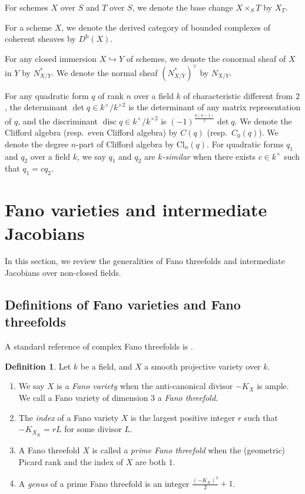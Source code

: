 \documentclass[autodetect-engine, a4paper]{amsart}
\theoremstyle{definition}
\newtheorem{defn}[thm]{Definition}
\DeclareMathOperator\disc{\mathrm{disc}}
\begin{document}
For schemes $X$ over $S$ and $T$ over $S$, we denote the base change $X \times_{S} T$ by $X_{T}$.

For a scheme $X$, we denote the derived category of bounded complexes of coherent sheaves by $D^{\mathrm{b}} (X)$.

For any closed immersion $X \hookrightarrow Y$ of schemes, we denote the conormal sheaf of $X$ in $Y$ by $N^{\ast}_{X/Y}$.
We denote the normal sheaf $(N^{\ast}_{X/Y})^{\vee}$ by $N_{X/Y}$.

For any quadratic form $q$ of rank $n$ over a field $k$ of characteristic different from $2$, the determinant $\det q \in k^{\times}/ k^{\times 2}$ is the determinant of any matrix representation of $q$, 
and the discriminant $\disc q \in k^{\times }/ k^{\times 2}$ is $(-1)^{\frac{n(n-1)}{2}} \det q.$
We denote the Clifford algebra (resp.\ even Clifford algebra) by $C(q)$ (resp.\ $C_{0} (q)$).
We denote the degree $n$-part of Clifford algebra by $\mathrm{Cl}_{n} (q)$.
For quadratic forms $q_{1}$ and $q_{2}$ over a field $k$, we say $q_{1}$ and $q_{2}$ are \emph{$k$-similar} when there exists $c\in k^{\times}$ such that $q_{1} = cq_{2}$.









\section{Fano varieties and intermediate Jacobians}
\label{section:intermediate}
In this section, we review the generalities of Fano threefolds and intermediate Jacobians over non-closed fields.

\subsection{Definitions of Fano varieties and Fano threefolds}

A standard reference of complex Fano threefolds is \cite{Iskovskikh-Prokhorov}.

\begin{defn}
Let $k$ be a field, and $X$ a smooth projective variety over $k$.
\begin{enumerate}
\item
We say $X$ is a \emph{Fano variety} when the anti-canonical divisor $-K_{X}$ is ample.
We call a Fano variety of dimension $3$ a \emph{Fano threefold}.
\item
The \emph{index} of a Fano variety $X$ is the largest positive integer $r$ such that $-K_{X_{\overline{K}}} =r L$ for some divisor $L$.
\item
A Fano threefold $X$ is called a \emph{prime Fano threefold} when the (geometric) Picard rank and the index of $X$ are both $1$.
\item 
A \emph{genus} of a prime Fano threefold is an integer $\frac{(-K_{X})^3}{2} +1$.
\end{enumerate}
\end{defn}
\end{document}
